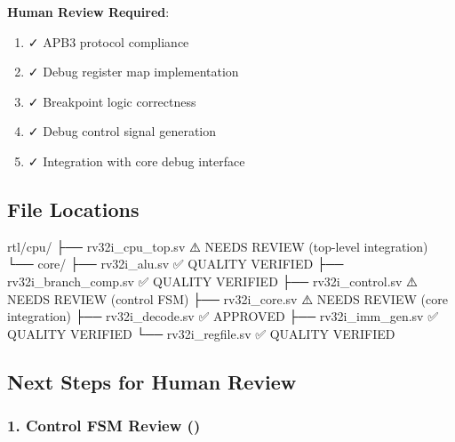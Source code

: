 \begin{record}
\textbf{Human Review Required}:

\begin{enumerate}
\def\labelenumi{\arabic{enumi}.}
\tightlist
\item
  ✓ APB3 protocol compliance
\item
  ✓ Debug register map implementation
\item
  ✓ Breakpoint logic correctness
\item
  ✓ Debug control signal generation
\item
  ✓ Integration with core debug interface
\end{enumerate}

\end{record}

\subsection{File Locations}\label{cr:fix:cpu-integration-summary:file-locations}

\begin{record}

\begin{textblock}
rtl/cpu/
├── rv32i_cpu_top.sv          ⚠️ NEEDS REVIEW (top-level integration)
└── core/
    ├── rv32i_alu.sv          ✅ QUALITY VERIFIED
    ├── rv32i_branch_comp.sv  ✅ QUALITY VERIFIED
    ├── rv32i_control.sv      ⚠️ NEEDS REVIEW (control FSM)
    ├── rv32i_core.sv         ⚠️ NEEDS REVIEW (core integration)
    ├── rv32i_decode.sv       ✅ APPROVED
    ├── rv32i_imm_gen.sv      ✅ QUALITY VERIFIED
    └── rv32i_regfile.sv      ✅ QUALITY VERIFIED
\end{textblock}

\end{record}

\subsection{Next Steps for Human Review}\label{cr:fix:cpu-integration-summary:next-steps-for-human-review}

\subsubsection{\texorpdfstring{1. Control FSM Review
()}{1. Control FSM Review ()}}\label{cr:fix:cpu-integration-summary:1-control-fsm-review-rv32i-controlsv}

